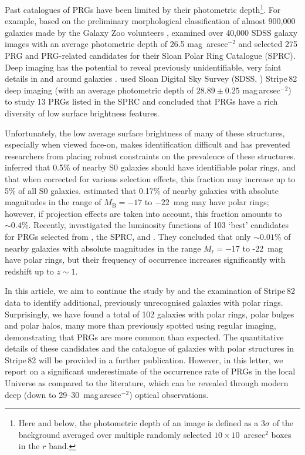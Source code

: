 \documentclass[letter]{aa}
\begin{document}
Past catalogues of PRGs have been limited by their photometric depth\footnote{Here and below, the photometric depth of an image is defined as a $3\sigma$ of the background averaged over multiple randomly selected $10\times10$~arcsec$^{2}$ boxes in the $r$ band.}. 
For example, based on the preliminary morphological classification of almost 900,000 galaxies made by the Galaxy Zoo volunteers \citep{2011MNRAS.410..166L}, \citet{2011MNRAS.418..244M} examined over 40,000 SDSS galaxy images with an average photometric depth of 26.5 mag~arcsec$^{-2}$ and selected 275 PRG and PRG-related candidates for their Sloan Polar Ring Catalogue (SPRC).
Deep imaging has the potential to reveal previously unidentifiable, very faint details in and around galaxies \citep[see e.g.][and references therein]{abraham2014ultra,2015MNRAS.446..120D,2023A&A...671A.141M}. \citet{mosenkov2022unveiling} used Sloan Digital Sky Survey (SDSS, \citealt{2000AJ....120.1579Y}) Stripe\,82 deep imaging (with an average photometric depth of $28.89 \pm 0.25$ mag\,arcsec$^{-2}$) to study 13 PRGs listed in the SPRC and concluded that PRGs have a rich diversity of low surface brightness features. 

Unfortunately, the low average surface brightness of many of these structures, especially when viewed face-on, makes identification difficult and has prevented researchers from placing robust constraints on the prevalence of these structures. \citet{1990AJ....100.1489W} inferred that 0.5\% of nearby S0 galaxies should have identifiable polar rings, and that when corrected for various selection effects, this fraction may increase up to 5\% of all S0 galaxies. \citet{reshetnikov2011polar} estimated that 0.17\% of nearby galaxies with absolute magnitudes in the range of $M_\mathrm{B}=-17$ to $-22$~mag may have polar rings; however, if projection effects are taken into account, this fraction amounts to $\sim0.4$\%. Recently, \citet{2022MNRAS.516.3692S} investigated the luminosity functions of 103 `best' candidates for PRGs selected from \citet{1990AJ....100.1489W}, the SPRC, and \citet{2019MNRAS.483.1470R}. They concluded that only $\sim0.01$\% of nearby galaxies with absolute magnitudes in the range $M_\mathrm{r}=-17$ to -22~mag have polar rings, but their frequency of occurrence increases significantly with redshift up to $z\sim1$.

In this article, we aim to continue the study by \citet{mosenkov2022unveiling} and the examination of Stripe\,82 data to identify additional, previously unrecognised galaxies with polar rings. Surprisingly, we have found a total of 102 galaxies with polar rings, polar bulges and polar halos, many more than previously spotted using regular imaging, demonstrating that PRGs are more common than expected. The quantitative details of these candidates and the catalogue of galaxies with polar structures in Stripe\,82 will be provided in a further publication. However, in this letter, we report on a significant underestimate of the occurrence rate of PRGs in the local Universe as compared to the literature, which can be revealed through modern deep (down to 29--30~mag\,arcsec$^{-2}$) optical observations.
\end{document}
